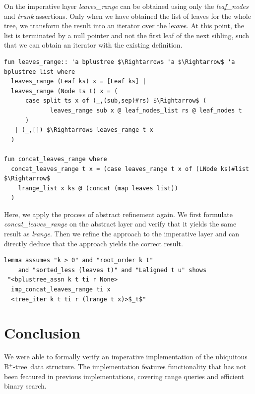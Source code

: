 \documentclass[a4paper,UKenglish,cleveref, cref, thm-restate]{lipics-v2021}
\newcommand{\btree}{B$^+$-tree}
\begin{document}
On the imperative layer \emph{leaves\_range}
can be obtained using only the \emph{leaf\_nodes} and \emph{trunk}
assertions.
Only when we have obtained the list of leaves for the whole tree,
we transform the result into an iterator over the leaves.
At this point, the list is terminated by a null pointer
and not the first leaf of the next sibling,
such that we can obtain an iterator with the existing definition.

\begin{lstlisting}[mathescape=true, language=Isabelle,label=lst:btree-leaves-range]
fun leaves_range:: 'a bplustree $\Rightarrow$ 'a $\Rightarrow$ 'a bplustree list where
  leaves_range (Leaf ks) x = [Leaf ks] |
  leaves_range (Node ts t) x = (
      case split ts x of (_,(sub,sep)#rs) $\Rightarrow$ (
             leaves_range sub x @ leaf_nodes_list rs @ leaf_nodes t
      )
   | (_,[]) $\Rightarrow$ leaves_range t x
  )

fun concat_leaves_range where
  concat_leaves_range t x = (case leaves_range t x of (LNode ks)#list $\Rightarrow$
    lrange_list x ks @ (concat (map leaves list))
  )
\end{lstlisting}

Here, we apply the process of abstract refinement again.
We first formulate \emph{concat\_leaves\_range} on the abstract layer
and verify that it yields the same result as \emph{lrange}.
Then we refine the approach to the imperative layer
and can directly deduce that the approach yields the correct result.

\begin{lstlisting}[mathescape=true, language=Isabelle,label=lst:btree-leaves-range]
lemma assumes "k > 0" and "root_order k t" 
    and "sorted_less (leaves t)" and "Laligned t u" shows 
 "<bplustree_assn k t ti r None>
  imp_concat_leaves_range ti x
  <tree_iter k t ti r (lrange t x)>$_t$"
\end{lstlisting}



\section{Conclusion}
\label{sec:conclusion}

We were able to formally verify an imperative implementation
of the ubiquitous \btree\ data structure.
The implementation features functionality that has not been 
featured in previous implementations,
covering range queries and efficient binary search.
\end{document}
